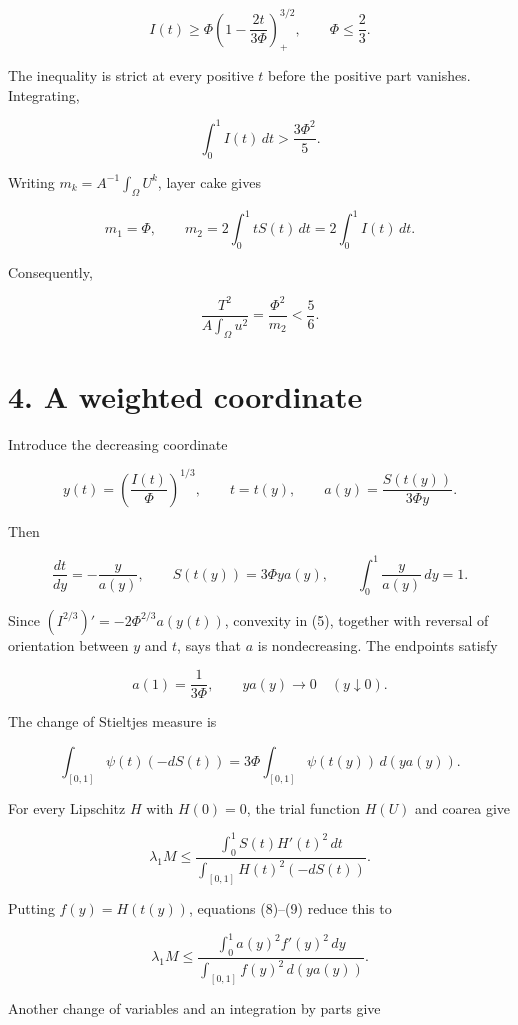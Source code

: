 \documentclass[11pt,a4paper]{article}
\begin{document}
\[
 I(t)\ge\Phi\left(1-\frac{2t}{3\Phi}\right)_+^{3/2},
 \qquad \Phi\le\frac23.
\]

The inequality is strict at every positive \(t\) before the positive
part vanishes. Integrating,

\[
 \int_0^1 I(t)\,dt>\frac{3\Phi^2}{5}.
\]

Writing \(m_k=A^{-1}\int _\Omega U^k\), layer cake gives

\[
 m_1=\Phi,\qquad
 m_2=2\int_0^1tS(t)\,dt=2\int_0^1 I(t)\,dt.
\]

Consequently,

\[
 \boxed{\frac{T^2}{A\int_\Omega u^2}
       =\frac{\Phi^2}{m_2}<\frac56.}
 \tag{6}
\]

\hypertarget{1028-a-weighted-coordinate}{%
\section{4. A weighted coordinate}\label{1028-a-weighted-coordinate}}

Introduce the decreasing coordinate

\[
 y(t)=\left(\frac{I(t)}{\Phi}\right)^{1/3},
 \qquad t=t(y),
 \qquad
 a(y)=\frac{S(t(y))}{3\Phi y}.
 \tag{7}
\]

Then

\[
 \frac{dt}{dy}=-\frac{y}{a(y)},\qquad
 S(t(y))=3\Phi y a(y),\qquad
 \int_0^1\frac{y}{a(y)}\,dy=1.
 \tag{8}
\]

Since \((I^{2/3})'=-2 \Phi ^{2/3} a(y(t))\), convexity in (5), together
with reversal of orientation between \(y\) and \(t\), says that \(a\) is
nondecreasing. The endpoints satisfy

\[
 a(1)=\frac1{3\Phi},\qquad
 y a(y)\longrightarrow0\quad (y\downarrow0).
\]

The change of Stieltjes measure is

\[
 \int_{[0,1]}\psi(t)(-dS(t))
 =3\Phi\int_{[0,1]}\psi(t(y))\,d(ya(y)).
 \tag{9}
\]

For every Lipschitz \(H\) with \(H(0)=0\), the trial function \(H(U)\)
and coarea give

\[
 \lambda_1M
 \le\frac{\int_0^1 S(t)H'(t)^2\,dt}
          {\int_{[0,1]}H(t)^2(-dS(t))}.
\]

Putting \(f(y)=H(t(y))\), equations (8)--(9) reduce this to

\[
 \lambda_1M\le
 \frac{\int_0^1 a(y)^2 f'(y)^2\,dy}
      {\int_{[0,1]}f(y)^2\,d(ya(y))}.
 \tag{10}
\]

Another change of variables and an integration by parts give
\end{document}
